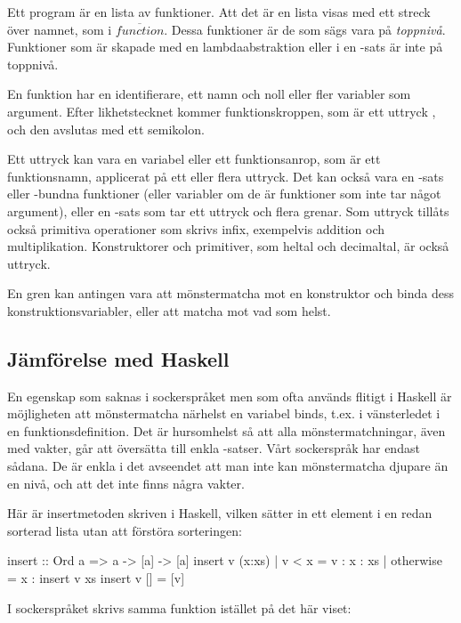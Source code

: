 \documentclass[Rapport]{subfiles}
\begin{document}
Ett program är en lista av funktioner. Att det är en lista visas med ett streck över namnet, som i $\overline{function}$.
Dessa funktioner är de som sägs vara på \emph{toppnivå}. Funktioner som är 
skapade med en lambdaabstraktion eller i en -sats är inte på toppnivå. 

En funktion har en identifierare, ett namn och noll eller fler variabler som argument. Efter likhetstecknet
kommer funktionskroppen, som är ett uttryck , och den avslutas med
ett semikolon.

    Ett uttryck kan vara en variabel eller ett funktionsanrop, som är ett
funktionsnamn, applicerat på ett eller flera uttryck. Det kan också vara en -sats eller
-bundna funktioner (eller variabler om de är funktioner som
inte tar något argument), eller en -sats som tar ett uttryck och flera grenar.
Som uttryck tillåts också primitiva operationer som skrivs infix, exempelvis addition 
och multiplikation. Konstruktorer och primitiver, som heltal och decimaltal, är också uttryck.

    En gren kan antingen vara att mönstermatcha mot en konstruktor och binda
dess konstruktionsvariabler, eller att matcha mot vad som helst.


\subsection{Jämförelse med Haskell}

    En egenskap som saknas i sockerspråket men som ofta används flitigt i Haskell är 
möjligheten att mönstermatcha närhelst en variabel binds, t.ex. i vänsterledet
i en funktionsdefinition. Det är hursomhelst så att alla mönstermatchningar,
även med vakter, går att översätta till enkla -satser. Vårt sockerspråk
har endast sådana. De är enkla i det avseendet att man inte kan mönstermatcha djupare
än en nivå, och att det inte finns några vakter.

Här är insertmetoden skriven i Haskell, vilken sätter in ett element i en redan sorterad
lista utan att förstöra sorteringen:

\begin{codeEx}
  insert :: Ord a => a -> [a] -> [a]
  insert v (x:xs) 
      | v < x     = v : x : xs
      | otherwise = x : insert v xs 
  insert v [] = [v]
\end{codeEx}                  

I sockerspråket skrivs samma funktion istället på det här viset:
\end{document}
